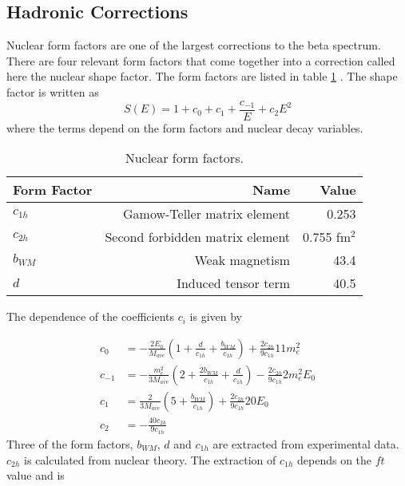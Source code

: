 \documentclass[../MaxHughesThesis.tex]{subfiles}
\begin{document}
\subsection{Hadronic Corrections}

Nuclear form factors are one of the largest corrections to the beta spectrum.
There are four relevant form factors that come together into a correction called here the nuclear shape factor.
The form factors are listed in table \ref{tab:formfact} \cite{Cal77}.
The shape factor is written as 
\begin{equation}
	\label{eq:shapefactor}
	S(E) = 1 + c_{0} + c_{1} + \frac{c_{-1}}{E} + c_{2}E^{2}	
\end{equation}
where the terms depend on the form factors and nuclear decay variables.
\begin{table}[!hbt]
	\centering
	\caption{Nuclear form factors.}
		\begin{tabular}{lrr} \hline \hline
		Form Factor & Name & Value \\ \hline
		$c_{1h}$ & Gamow-Teller matrix element & 0.253  \cite{Min11}\\
		$c_{2h}$ & Second forbidden matrix element & 0.755 fm$^{2}$ \cite{Cal77} \\
		$b_{WM}$ & Weak magnetism & 43.4  \cite{Min11} \\
		$d$ & Induced tensor term & 40.5  \cite{Min11} \\ \hline \hline
		\end{tabular}
	\label{tab:formfact}
\end{table}
The dependence of the coefficients $c_{i}$ is given by\cite{Cal77}

\begin{equation}
	\label{eq:sfcs}
	\begin{split}
	c_{0} & = -\frac{2 E_{0}}{M_{ave}}(1 + \frac{d}{c_{1h}} + \frac{b_{WM}}{c_{1h}})  + \frac{2 c_{2h}}{9 c_{1h}} 11 m_{e}^{2} \\
	c_{-1} & = -\frac{m_{e}^{2}}{3M_{ave}} (2 + \frac{2b_{WM}}{c_{1h}} + \frac{d}{c_{1h}})  - \frac{2 c_{2h}}{9 c_{1h}} 2 m_{e}^{2} E_{0}\\
	c_{1} & =  \frac{2}{3M_{ave}} (5 + \frac{b_{WM}}{c_{1h}}) + \frac{2 c_{2h}}{9 c_{1h}} 20 E_{0} \\
	c_{2} & = -\frac{40 c_{2h}}{9 c_{1h}} 
	\end{split}
\end{equation}
Three of the form factors, $b_{WM}$, $d$ and $c_{1h}$ are extracted from experimental data. 
$c_{2h}$ is calculated from nuclear theory. 
The extraction of $c_{1h}$ depends on the $ft$ value and is \cite{Min11}
\end{document}
